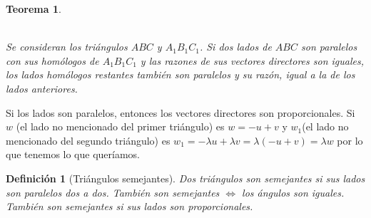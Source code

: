 \documentclass[11pt, a4paper]{article}
\makeatletter
\newif\IfInSansMode
\let\oldsf\sffamily
\renewcommand*{\sffamily}{\oldsf\mathversion{sans}\InSansModetrue}
\let\oldnorm\normalfont
\renewcommand*{\normalfont}{\oldnorm\InSansModefalse\mathversion{normal}}
\renewenvironment{proof}[1][\proofname] {\vspace{-15pt}\par\pushQED{\qed}\normalfont\topsep6\p@\@plus6\p@\relax\trivlist\item[\hskip\labelsep\it#1\@addpunct{.}]\ignorespaces}{\popQED\endtrivlist\@endpefalse}
\renewenvironment{proof}[1][\proofname] {\par\pushQED{\qed}\normalfont\topsep6\p@\@plus6\p@\relax\trivlist\item[\hskip\labelsep\itshape\sffamily#1\@addpunct{.}]\ignorespaces}{\popQED\endtrivlist\@endpefalse}
\theoremstyle{theorem-style}
\newtheorem{nth}{Teorema}[section]
\theoremstyle{definition-style}
\newtheorem{ndef}{Definición}[section]
\theoremstyle{remark-style}
\theoremstyle{example-style}
\makeatother
\begin{document}
\begin{nth}\hfill\\
\begin{minipage}[c]{0.50\textwidth}
  \hfill\\
  Se consideran los triángulos $ABC$ y $A_1B_1C_1$. Si dos lados de $ABC$ son paralelos con sus homólogos de $A_1B_1C_1$ y las razones de sus vectores directores son iguales, los lados homólogos restantes también son paralelos y su razón, igual a la de los lados anteriores.
\end{minipage}\hfill
\begin{minipage}[]{0.47\textwidth}
\end{minipage}

  \end{nth}
  
  \begin{proof}
    Si los lados son paralelos, entonces los vectores directores son proporcionales.
    Si $w$ (el lado no mencionado del primer triángulo) es $w=-u+v$ y $w_1$(el lado no mencionado del segundo triángulo) es $w_1 = - \lambda u + \lambda v = \lambda (-u+v) = \lambda w$  por lo que tenemos lo que queríamos.
  \end{proof}

\begin{ndef}[Triángulos semejantes]
  Dos triángulos son semejantes si sus lados son paralelos dos a dos. También son semejantes $\iff$ los ángulos son iguales. También son semejantes si sus lados son proporcionales.
\end{ndef}
\end{document}
